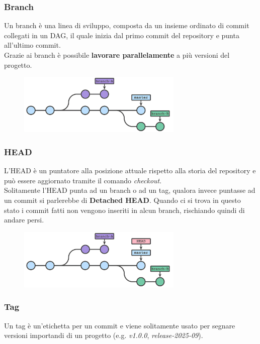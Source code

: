 \documentclass[12pt]{article}
\begin{document}
    \subsubsection{Branch}
    Un branch è una linea di sviluppo, composta da un insieme ordinato di commit collegati in un DAG, il quale inizia dal primo commit del repository e punta all'ultimo commit.\\
    Grazie ai branch è possibile \textbf{lavorare parallelamente} a più versioni del progetto.
    \begin{figure}[H]
      \centering
      \includegraphics[width=0.7\textwidth]{introduzione_a_git/branch.png}
    \end{figure}

    \subsubsection{HEAD}
    L'HEAD è un puntatore alla posizione attuale rispetto alla storia del repository e può essere aggiornato tramite il comando \textit{checkout}.\\
    Solitamente l'HEAD punta ad un branch o ad un tag, qualora invece puntasse ad un commit si parlerebbe di \textbf{Detached HEAD}. Quando ci si trova in questo stato i commit fatti non vengono inseriti in alcun branch, rischiando quindi di andare persi.
    \begin{figure}[H]
      \centering
      \includegraphics[width=0.7\textwidth]{introduzione_a_git/branch_head.png}
    \end{figure}

    \subsubsection{Tag}
    Un tag è un'etichetta per un commit e viene solitamente usato per segnare versioni importandi di un progetto (e.g. \textit{v1.0.0}, \textit{release-2025-09}).
\end{document}
